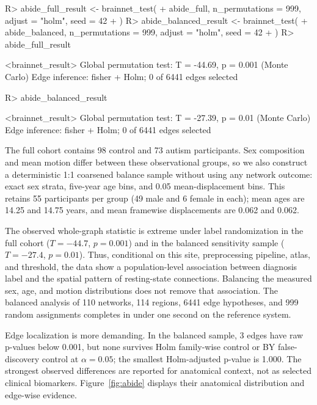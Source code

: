 \documentclass[article]{jss}\usepackage[]{graphicx}\usepackage[]{xcolor}
\begin{document}
\begin{Schunk}
\begin{Sinput}
R> abide_full_result <- brainnet_test(
+    abide_full, n_permutations = 999, adjust = "holm", seed = 42
+  )
R> abide_balanced_result <- brainnet_test(
+    abide_balanced, n_permutations = 999, adjust = "holm", seed = 42
+  )
R> abide_full_result
\end{Sinput}
\begin{Soutput}
<brainnet_result>
Global permutation test: T = -44.69, p = 0.001 (Monte Carlo)
Edge inference: fisher + Holm; 0 of 6441 edges selected
\end{Soutput}
\begin{Sinput}
R> abide_balanced_result
\end{Sinput}
\begin{Soutput}
<brainnet_result>
Global permutation test: T = -27.39, p = 0.01 (Monte Carlo)
Edge inference: fisher + Holm; 0 of 6441 edges selected
\end{Soutput}
\end{Schunk}



The full cohort contains 98 control and 73 autism
participants. Sex composition and mean motion differ between these
observational groups, so we also construct a deterministic 1:1 coarsened
balance sample without using any network outcome: exact sex strata, five-year
age bins, and 0.05 mean-displacement bins. This retains 55
participants per group (49 male and 6 female in each); mean ages are
14.25 and
14.75 years, and mean framewise
displacements are 0.062 and
0.062.

The observed whole-graph statistic is extreme under label randomization in the
full cohort
($T=-44.7$,
$p=0.001$) and in the balanced sensitivity
sample ($T=-27.4$,
$p=0.01$). Thus, conditional on this
site, preprocessing pipeline, atlas, and threshold, the data show a
population-level association between diagnosis label and the spatial pattern
of resting-state connections. Balancing the measured sex, age, and motion
distributions does not remove that association. The balanced analysis of
110 networks, 114 regions,
6441 edge hypotheses, and
999 random assignments completes in under one second on the reference system.

Edge localization is more demanding. In the balanced sample,
3 edges have raw p-values below 0.001, but none survives
Holm family-wise control or BY false-discovery control at $\alpha=0.05$; the
smallest Holm-adjusted p-value is
1.000. The strongest observed differences are
reported for anatomical context, not as selected clinical biomarkers.
Figure~\ref{fig:abide} displays their anatomical distribution and edge-wise
evidence.
\end{document}
